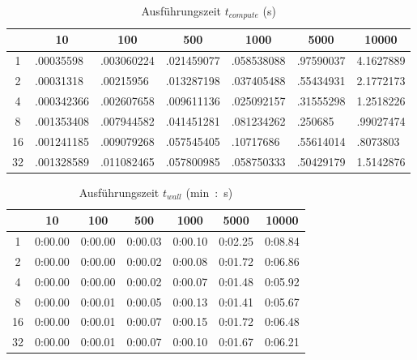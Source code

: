 \documentclass[12pt]{article}
\begin{document}
	\begin{table}[H]
		\centering
		\caption[Ausführungszeit $t_{compute}$ (\si{\second})]{Ausführungszeit $t_{compute}$ (\si{\second})}
		\begin{tabular}{c|l|l|l|l|l|l}
			\hline
			\cellcolor{gray!40}\textbf{\diagbox{Thr.}{M$\times$N}} & \multicolumn{1}{c}{\cellcolor{gray!40}\textbf{10}} & \multicolumn{1}{c}{\cellcolor{gray!40}\textbf{100}} & \multicolumn{1}{c}{\cellcolor{gray!40}\textbf{500}} &
			\multicolumn{1}{c}{\cellcolor{gray!40}\textbf{1000}} &
			\multicolumn{1}{c}{\cellcolor{gray!40}\textbf{5000}} &
			\multicolumn{1}{c}{\cellcolor{gray!40}\textbf{10000}} \\
			\hline\hline
			1 & .00035598 & .003060224 & .021459077 & .058538088 & .97590037 & 4.1627889 \\\hline
			2 & .00031318 & .00215956 & .013287198 & .037405488 & .55434931 & 2.1772173 \\\hline
			4 & .000342366 & .002607658 & .009611136 & .025092157 & .31555298 & 1.2518226 \\\hline
			8 & .001353408 & .007944582 & .041451281 & .081234262 & .250685 & .99027474 \\\hline
			16 & .001241185 & .009079268 & .057545405 & .10717686 & .55614014 & .8073803 \\\hline
			32 & .001328589 & .011082465 & .057800985 & .058750333 & .50429179 & 1.5142876 \\\hline
		\end{tabular}
		\label{tab:tcomp}
	\end{table}


\begin{table}[ht]
	\centering
	\caption[Ausführungszeit $t_{wall}$ (\si{\second})]{Ausführungszeit $t_{wall}$ (\si{\minute:\second})}
	\begin{tabular}{c|l|l|l|l|l|l}
		\hline
		\cellcolor{gray!40}\textbf{\diagbox{Thr.}{M$\times$N}} & \multicolumn{1}{c}{\cellcolor{gray!40}\textbf{10}} & \multicolumn{1}{c}{\cellcolor{gray!40}\textbf{100}} & \multicolumn{1}{c}{\cellcolor{gray!40}\textbf{500}} &
		\multicolumn{1}{c}{\cellcolor{gray!40}\textbf{1000}} &
		\multicolumn{1}{c}{\cellcolor{gray!40}\textbf{5000}} &
		\multicolumn{1}{c}{\cellcolor{gray!40}\textbf{10000}} \\
		\hline\hline
		1 & 0:00.00 & 0:00.00 & 0:00.03 & 0:00.10 & 0:02.25 & 0:08.84 \\\hline
		2 & 0:00.00 & 0:00.00 & 0:00.02 & 0:00.08 & 0:01.72 & 0:06.86 \\\hline
		4 & 0:00.00 & 0:00.00 & 0:00.02 & 0:00.07 & 0:01.48 & 0:05.92 \\\hline
		8 & 0:00.00 & 0:00.01 & 0:00.05 & 0:00.13 & 0:01.41 & 0:05.67 \\\hline
		16 & 0:00.00 & 0:00.01 & 0:00.07 & 0:00.15 & 0:01.72 & 0:06.48 \\\hline
		32 & 0:00.00 & 0:00.01 & 0:00.07 & 0:00.10 & 0:01.67 & 0:06.21 \\\hline
	\end{tabular}
	\label{tab:twall}
\end{table}
\end{document}
